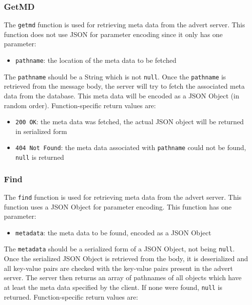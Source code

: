 \subsubsection{GetMD}
\label{getmd}
The \texttt{getmd} function is used for retrieving meta data from the advert
server. This function does not use JSON for parameter encoding since it only has
one
parameter:

\begin{itemize}
  \item \texttt{pathname}: the location of the meta data to be fetched
\end{itemize}

The \texttt{pathname} should be a String which is not \texttt{null}. Once the
\texttt{pathname} is retrieved from the message body, the server will try to
fetch the associated meta data from the database. This meta data will be
encoded as a JSON Object (in random order). Function-specific return values are:

\begin{itemize}
  \item \texttt{200 OK}: the meta data was fetched, the actual JSON object will
  be returned in serialized form
  \item \texttt{404 Not Found}: the meta data associated with \texttt{pathname}
  could not be found, \texttt{null} is returned
\end{itemize}

\subsubsection{Find}
\label{find}
The \texttt{find} function is used for retrieving meta data from the advert
server. This function uses a JSON Object for parameter encoding. This function
has one parameter:

\begin{itemize}
  \item \texttt{metadata}: the meta data to be found, encoded as a JSON Object
\end{itemize}

The \texttt{metadata} should be a serialized form of a JSON Object, not being
\texttt{null}. Once the serialized JSON Object is retrieved from the body, it
is deserialized and all key-value pairs are checked with the key-value pairs
present in the advert server. The server then returns an array of
pathnames of all objects which have at least the meta data specified by the
client. If none were found, \texttt{null} is returned. Function-specific return
values are:

